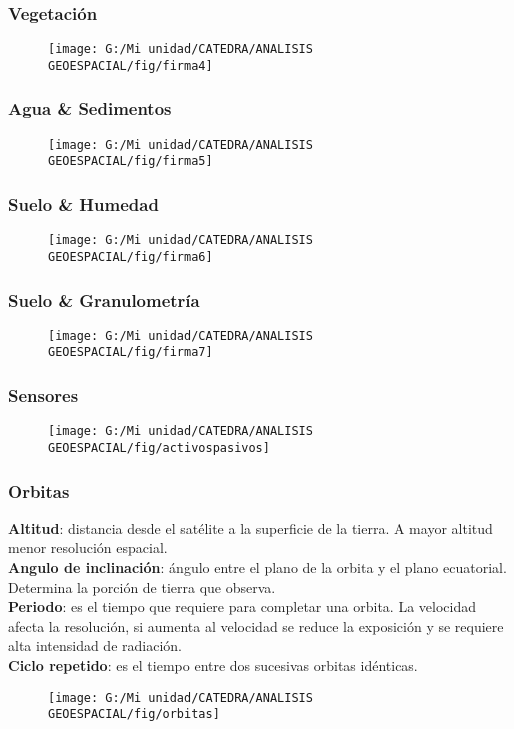 \documentclass[14pt]{beamer}
\begin{document}
\begin{frame}
\frametitle{Vegetación}
  \begin{figure}
    \centering
    \texttt{[image: G:/Mi unidad/CATEDRA/ANALISIS GEOESPACIAL/fig/firma4]}
  \end{figure}
\end{frame}
\begin{frame}
\frametitle{Agua \& Sedimentos}
  \begin{figure}
    \centering
    \texttt{[image: G:/Mi unidad/CATEDRA/ANALISIS GEOESPACIAL/fig/firma5]}
  \end{figure}
\end{frame}
\begin{frame}
\frametitle{Suelo \& Humedad}
  \begin{figure}
    \centering
    \texttt{[image: G:/Mi unidad/CATEDRA/ANALISIS GEOESPACIAL/fig/firma6]}
  \end{figure}
\end{frame}
\begin{frame}
\frametitle{Suelo \& Granulometría}
  \begin{figure}
    \centering
    \texttt{[image: G:/Mi unidad/CATEDRA/ANALISIS GEOESPACIAL/fig/firma7]}
  \end{figure}
\end{frame}
\begin{frame}
\frametitle{Sensores}
  \begin{figure}
    \centering
    \texttt{[image: G:/Mi unidad/CATEDRA/ANALISIS GEOESPACIAL/fig/activospasivos]}
  \end{figure}
\end{frame}
 \begin{frame}
\frametitle{Orbitas}
\scriptsize{
\textbf{Altitud}: distancia desde el satélite a la superficie de la tierra. A mayor altitud menor resolución espacial.\\
\textbf{Angulo de inclinación}:  ángulo entre el plano de la orbita y el plano ecuatorial. Determina la porción de tierra que observa.\\
\textbf{Periodo}: es el tiempo que requiere para completar una orbita. La velocidad afecta la resolución, si aumenta al velocidad se reduce la exposición y se requiere alta intensidad de radiación.\\
\textbf{Ciclo repetido}: es el tiempo entre dos sucesivas orbitas idénticas.
}
 \begin{figure}
    \centering
    \texttt{[image: G:/Mi unidad/CATEDRA/ANALISIS GEOESPACIAL/fig/orbitas]}
  \end{figure}
\end{frame}
\end{document}
